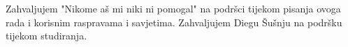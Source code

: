 \vspace{5pt}

\begin{flushleft}
\noindent Zahvaljujem "Nikome aš mi niki ni pomogal" na podršci tijekom pisanja ovoga rada i korisnim raspravama i savjetima. Zahvaljujem Diegu Šušnju na podršku tijekom studiranja.
\end{flushleft}